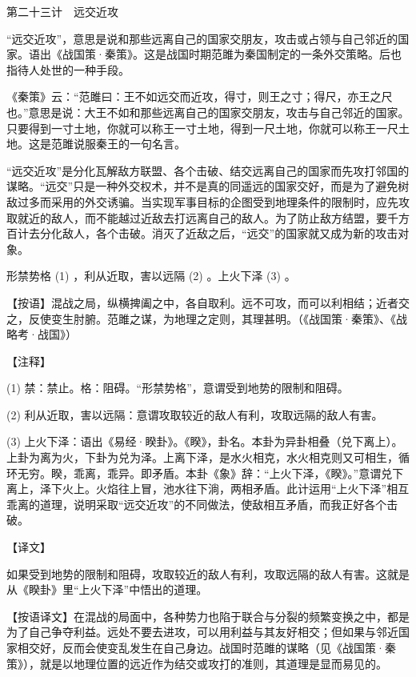 \documentclass[12pt,UTF8]{ctexbook}
\begin{document}
第二十三计　远交近攻


“远交近攻”，意思是说和那些远离自己的国家交朋友，攻击或占领与自己邻近的国家。语出《战国策·秦策》。这是战国时期范雎为秦国制定的一条外交策略。后也指待人处世的一种手段。

《秦策》云：“范雎曰：王不如远交而近攻，得寸，则王之寸；得尺，亦王之尺也。”意思是说：大王不如和那些远离自己的国家交朋友，攻击与自己邻近的国家。只要得到一寸土地，你就可以称王一寸土地，得到一尺土地，你就可以称王一尺土地。这是范雎说服秦王的一句名言。

“远交近攻”是分化瓦解敌方联盟、各个击破、结交远离自己的国家而先攻打邻国的谋略。“远交”只是一种外交权术，并不是真的同遥远的国家交好，而是为了避免树敌过多而采用的外交诱骗。当实现军事目标的企图受到地理条件的限制时，应先攻取就近的敌人，而不能越过近敌去打远离自己的敌人。为了防止敌方结盟，要千方百计去分化敌人，各个击破。消灭了近敌之后，“远交”的国家就又成为新的攻击对象。





形禁势格 (1) ，利从近取，害以远隔 (2) 。上火下泽 (3) 。

【按语】混战之局，纵横捭阖之中，各自取利。远不可攻，而可以利相结；近者交之，反使变生肘腑。范雎之谋，为地理之定则，其理甚明。（《战国策·秦策》、《战略考·战国》）





【注释】


(1) 禁：禁止。格：阻碍。“形禁势格”，意谓受到地势的限制和阻碍。

(2) 利从近取，害以远隔：意谓攻取较近的敌人有利，攻取远隔的敌人有害。

(3) 上火下泽：语出《易经·睽卦》。《睽》，卦名。本卦为异卦相叠（兑下离上）。上卦为离为火，下卦为兑为泽。上离下泽，是水火相克，水火相克则又可相生，循环无穷。睽，乖离，乖异。即矛盾。本卦《象》辞：“上火下泽，《睽》。”意谓兑下离上，泽下火上。火焰往上冒，池水往下淌，两相矛盾。此计运用“上火下泽”相互乖离的道理，说明采取“远交近攻”的不同做法，使敌相互矛盾，而我正好各个击破。





【译文】


如果受到地势的限制和阻碍，攻取较近的敌人有利，攻取远隔的敌人有害。这就是从《睽卦》里“上火下泽”中悟出的道理。

【按语译文】在混战的局面中，各种势力也陷于联合与分裂的频繁变换之中，都是为了自己争夺利益。远处不要去进攻，可以用利益与其友好相交；但如果与邻近国家相交好，反而会使变乱发生在自己身边。战国时范雎的谋略（见《战国策·秦策》），就是以地理位置的远近作为结交或攻打的准则，其道理是显而易见的。
\end{document}
